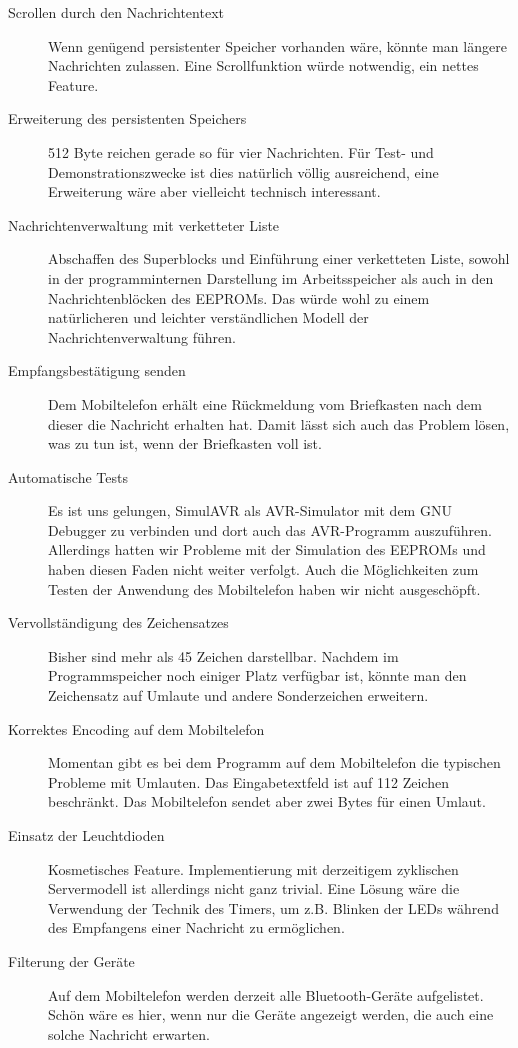 \documentclass[ngerman]{article}
\begin{document}
\begin{description}
    \item[Scrollen durch den Nachrichtentext] Wenn genügend persistenter Speicher vorhanden wäre, könnte man 
        längere Nachrichten zulassen. Eine Scrollfunktion würde notwendig, ein nettes
        Feature.
    \item[Erweiterung des persistenten Speichers] 512 Byte reichen gerade so für vier Nachrichten. Für Test-
        und Demonstrationszwecke ist dies natürlich völlig ausreichend, eine Erweiterung wäre aber vielleicht
        technisch interessant.
    \item[Nachrichtenverwaltung mit verketteter Liste] Abschaffen des Superblocks und Einführung einer verketteten
        Liste, sowohl in der programminternen Darstellung im Arbeitsspeicher als auch in den Nachrichtenblöcken
        des EEPROMs. Das würde wohl zu einem natürlicheren und leichter ver\-ständ\-lichen Modell der 
        Nachrichtenverwaltung führen.
    \item[Empfangsbestätigung senden] Dem Mobiltelefon erhält eine Rückmeldung vom Briefkasten nach dem
        dieser die Nachricht erhalten hat. Damit lässt sich auch das Problem lösen, was zu tun ist, 
        wenn der Briefkasten voll ist.
    \item[Automatische Tests] Es ist uns gelungen, SimulAVR als AVR-Simulator mit dem GNU Debugger
        zu verbinden und dort auch das AVR-Programm auszuführen. Allerdings hatten wir Probleme mit
        der Simulation des EEPROMs und haben diesen Faden nicht weiter verfolgt. Auch die Möglichkeiten
        zum Testen der Anwendung des Mobiltelefon haben wir nicht ausgeschöpft.
    \item[Vervollständigung des Zeichensatzes] Bisher sind mehr als 45 Zeichen darstellbar. Nachdem im
        Programmspeicher noch einiger Platz verfügbar ist, könnte man den Zeichensatz auf Umlaute
        und andere Sonderzeichen erweitern.
    \item[Korrektes Encoding auf dem Mobiltelefon] Momentan gibt es bei dem Programm auf dem Mobiltelefon
        die typischen Probleme mit Umlauten. Das Eingabetextfeld ist auf 112 Zeichen beschränkt. Das
        Mobiltelefon sendet aber zwei Bytes für einen Umlaut.
    \item[Einsatz der Leuchtdioden] Kosmetisches Feature. Implementierung mit derzeitigem zyklischen Servermodell
        ist allerdings nicht ganz trivial. Eine Lösung wäre die Verwendung der Technik des Timers, um z.B.
        Blinken der LEDs während des Empfangens einer Nachricht zu ermöglichen.
    \item[Filterung der Geräte] Auf dem Mobiltelefon werden derzeit alle Bluetooth-Geräte aufgelistet. Schön
        wäre es hier, wenn nur die Geräte angezeigt werden, die auch eine solche Nachricht erwarten.
\end{description}
\end{document}
